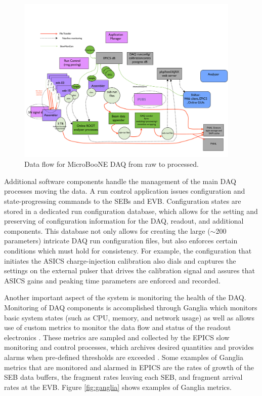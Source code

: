 \begin{figure}
\centering
\includegraphics[width=0.95\textwidth]{./figures/dataFlow.pdf}
\caption{Data flow for MicroBooNE DAQ from raw to processed.}
\label{fig:dataflow}
\end{figure}


Additional software components handle the management of the main DAQ processes moving the data. A run control application issues configuration and state-progressing commands to the SEBs and EVB. Configuration states are stored in a dedicated run configuration database, which allows for the setting and preserving of configuration information for the DAQ, readout, and additional components. This database not only allows for creating the large ($\sim$200 parameters) intricate DAQ run configuration files, but also enforces certain conditions which must hold for consistency. For example, the configuration that initiates the ASICS charge-injection calibration also dials and captures the settings on the external pulser that drives the calibration signal and assures that ASICS gains and peaking time parameters are enforced and recorded. %

Another important aspect of the system is monitoring the health of the DAQ. Monitoring of DAQ components is accomplished through Ganglia which monitors basic system states (such as CPU, memory, and network usage) as well as allows use of custom metrics to monitor the data flow and status of the readout electronics \cite{GangliaBook}. These metrics are sampled and collected by the EPICS slow monitoring and control processes, which archives desired quantities and provides alarms when pre-defined thresholds are exceeded \cite{EPICS}. Some examples of Ganglia metrics that are monitored and alarmed in EPICS are the rates of growth of the SEB data buffers, the fragment rates leaving each SEB, and fragment arrival rates at the EVB.  Figure \ref{fig:ganglia} shows examples of Ganglia metrics.  

